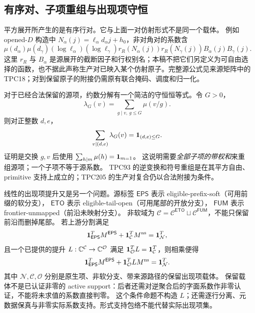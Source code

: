 \subsection{有序对、子项重组与出现项守恒}
平方展开所产生的是有序行对。它与上面一对仿射形式不是同一个载体。
例如 opened-$D$ 构造中 $N_\alpha(j)=\ell_\alpha d_\alpha j+h_0$，非对角对的系数含
\[
\mu(d_\alpha)\mu(d_\gamma)(\log\ell_\alpha)(\log\ell_\gamma)
r_R(N_\alpha(j))r_R(N_\gamma(j))B_\alpha(j)B_\gamma(j).
\]
这里 $r_R$ 与 $B_\alpha$ 是源展开的截断因子和行权别名；本稿不把它们另定义为可自由选择的函数，也不据此声称生产对已映入某个仿射原子。完整源公式见来源矩阵中的 TPC18；对到保留原子的附接仍需原有联合掩码、调度和归一化。

对于已经合法保留的源项，约数分解有一个简洁的守恒恒等式。令 $G>0$，
\[
\lambda_G(v)=\sum_{g\mid v,\ g\le G}\mu(v/g).
\]
则对正整数 $d,e$，
\[
\sum_{v\mid(d,e)}\lambda_G(v)=\mathbf 1_{(d,e)\le G}.
\]
证明是交换 $g,v$ 后使用 $\sum_{h\mid m}\mu(h)=\mathbf 1_{m=1}$。
这说明需要\emph{全部子项的带权和}来重组源项；一个子项不等于源系数。
TPC93 的逆变换和符号重组是在其平方自由、primitive 支持上成立的；TPC205 的生产对复合仍以合法附接为条件\cite{archivestructure}。

线性的出现项提升又是另一个问题。源标签 $\mathsf{EPS}$ 表示 eligible-prefix-soft（可用前缀的软分支），
$\mathsf{ETO}$ 表示 eligible-tail-open（可用尾部的开放分支），
$\mathsf{FUM}$ 表示 frontier-unmapped（前沿未映射分支）。
非软域为 $\mathcal C=\mathcal C^{\mathsf{ETO}}\sqcup\mathcal C^{\mathsf{FUM}}$，不能只保留前沿而删掉尾部。
若上游分割满足
\[
\mathbf 1_{\mathsf{EPS}}^TM^{\mathsf{EPS}}+\mathbf 1_{\mathcal C}^TM^{\rm ns}
=\mathbf 1_{\mathcal N}^T,
\]
且一个已提供的提升 $L:\mathbb C^{\mathcal C}\to\mathbb C^{\mathcal O}$ 满足
$\mathbf 1_{\mathcal O}^TL=\mathbf 1_{\mathcal C}^T$，则相乘便得
\[
\mathbf 1_{\mathsf{EPS}}^TM^{\mathsf{EPS}}+\mathbf 1_{\mathcal O}^TLM^{\rm ns}
=\mathbf 1_{\mathcal N}^T.
\]
其中 $\mathcal N,\mathcal C,\mathcal O$ 分别是原生项、非软分支、带来源路径的保留出现项载体。
保留载体不是已认证非零的 active support：后者还需对逆聚合后的字面系数作非零认证，不能将未求值的系数直接判零。
这个条件命题不构造 $L$；还需逐行分离、元数据保真与非零实际系数支持。形式支持包络不能代替实际出现项集。

